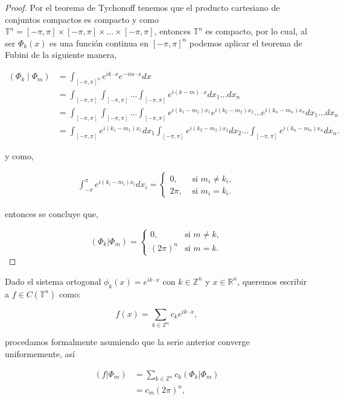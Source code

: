 \documentclass[12pt]{article}
\newcommand\R{\ensuremath{\mathbb{R}}}
\newcommand\Z{\ensuremath{\mathbb{Z}}}
\newcommand\T{\mathbb{T}}
\begin{document}
\begin{proof}
Por el teorema de Tychonoff tenemos que el producto cartesiano de conjuntos compactos es compacto y como $\T^{n}=[-\pi,\pi]\times [-\pi,\pi]\times\ldots\times[-\pi,\pi]$, entonces $\T^{n}$ es compacto, por lo cual, al ser $\Phi_k(x)$ es una función continua en $[-\pi,\pi]^n$ podemos aplicar el teorema de Fubini de la siguiente manera,

\begin{align*}
    \left(\Phi_k \mid \Phi_m\right)&=\int_{[-\pi,\pi]^n}e^{ik \cdot x}e^{-im\cdot x}dx\\
    &=\int_{[-\pi,\pi]}\int_{[-\pi,\pi]}\ldots \int_{[-\pi,\pi]}e^{i(k-m) \cdot x}dx_1\ldots dx_n\\
    &=\int_{[-\pi,\pi]}\int_{[-\pi,\pi]}\ldots \int_{[-\pi,\pi]}e^{i(k_1-m_1) x_1}e^{i(k_2-m_2) x_2}\ldots e^{i(k_n-m_n) x_n}dx_1\ldots dx_n\\
    &=\int_{[-\pi,\pi]}e^{i(k_1-m_1) x_1}dx_1\int_{[-\pi,\pi]}e^{i(k_2-m_2) x_2}dx_2\ldots \int_{[-\pi,\pi]} e^{i(k_n-m_n) x_n}dx_n
.\end{align*}

y como,

$$
\begin{aligned}
\int_{-\pi}^\pi e^{i(k_i-m_i)x_i} d x_i= \begin{cases}0, & \text { si } m_i \neq k_i, \\
2 \pi, & \text { si } m_i=k_i.\end{cases}
\end{aligned}
$$

entonces se concluye que,

$$(\Phi_k|\Phi_m)=\begin{cases}
0, \quad &\text{si } m\neq k,\\
(2\pi)^n &\text{si } m=k.
\end{cases}$$

\end{proof}

Dado el sistema ortogonal $\phi_k(x)=e^{ik\cdot x}$ con $k\in \Z^n$  y $x\in \R^n$, queremos escribir a $f\in C(\mathbb{T}^n)$ como:

$$f(x)=\sum_{k\in \Z^n}c_ke^{ik\cdot x},$$

procedamos formalmente asumiendo que la serie anterior converge uniformemente, así

\begin{align*}
    \left(f|\Phi_m\right)&=\sum_{k\in \Z^n} c_k\left(\Phi_k|\Phi_m\right)\\
    &=c_m (2\pi)^n
,\end{align*}
\end{document}
